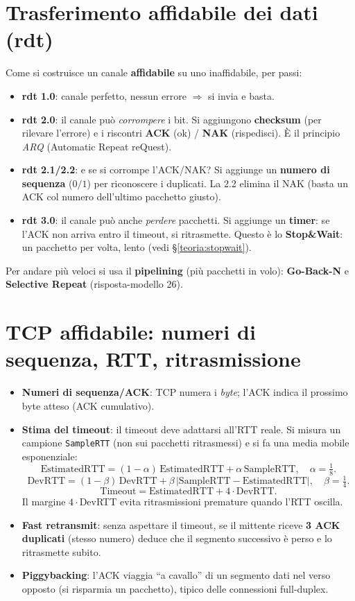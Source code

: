 \documentclass[11pt,a4paper]{report}
\begin{document}
\section{Trasferimento affidabile dei dati (rdt)}
\label{th:rdt}
Come si costruisce un canale \textbf{affidabile} su uno inaffidabile, per passi:
\begin{itemize}[noitemsep]
\item \textbf{rdt 1.0}: canale perfetto, nessun errore $\Rightarrow$ si invia e basta.
\item \textbf{rdt 2.0}: il canale può \emph{corrompere} i bit. Si aggiungono
\textbf{checksum} (per rilevare l'errore) e i riscontri \textbf{ACK} (ok) /
\textbf{NAK} (rispedisci). È il principio \emph{ARQ} (Automatic Repeat reQuest).
\item \textbf{rdt 2.1/2.2}: e se si corrompe l'ACK/NAK? Si aggiunge un
\textbf{numero di sequenza} ($0/1$) per riconoscere i duplicati. La 2.2 elimina
il NAK (basta un ACK col numero dell'ultimo pacchetto giusto).
\item \textbf{rdt 3.0}: il canale può anche \emph{perdere} pacchetti. Si aggiunge
un \textbf{timer}: se l'ACK non arriva entro il timeout, si ritrasmette. Questo è
lo \textbf{Stop\&Wait}: un pacchetto per volta, lento (vedi \S\ref{teoria:stopwait}).
\end{itemize}
Per andare più veloci si usa il \textbf{pipelining} (più pacchetti in volo):
\textbf{Go-Back-N} e \textbf{Selective Repeat} (risposta-modello 26).

\section{TCP affidabile: numeri di sequenza, RTT, ritrasmissione}
\label{th:tcprel}
\begin{itemize}[noitemsep]
\item \textbf{Numeri di sequenza/ACK}: TCP numera i \emph{byte}; l'ACK indica il
prossimo byte atteso (ACK cumulativo).
\item \textbf{Stima del timeout}: il timeout deve adattarsi all'RTT reale.
Si misura un campione \texttt{SampleRTT} (non sui pacchetti ritrasmessi) e si fa
una media mobile esponenziale:
\[ \text{EstimatedRTT}=(1-\alpha)\,\text{EstimatedRTT}+\alpha\,\text{SampleRTT},\quad \alpha=\tfrac{1}{8}. \]
\[ \text{DevRTT}=(1-\beta)\,\text{DevRTT}+\beta\,|\text{SampleRTT}-\text{EstimatedRTT}|,\quad \beta=\tfrac{1}{4}. \]
\[ \text{Timeout}=\text{EstimatedRTT}+4\cdot\text{DevRTT}. \]
Il margine $4\cdot$DevRTT evita ritrasmissioni premature quando l'RTT oscilla.
\item \textbf{Fast retransmit}: senza aspettare il timeout, se il mittente riceve
\textbf{3 ACK duplicati} (stesso numero) deduce che il segmento successivo è
perso e lo ritrasmette subito.
\item \textbf{Piggybacking}: l'ACK viaggia ``a cavallo'' di un segmento dati nel
verso opposto (si risparmia un pacchetto), tipico delle connessioni full-duplex.
\end{itemize}
\end{document}
